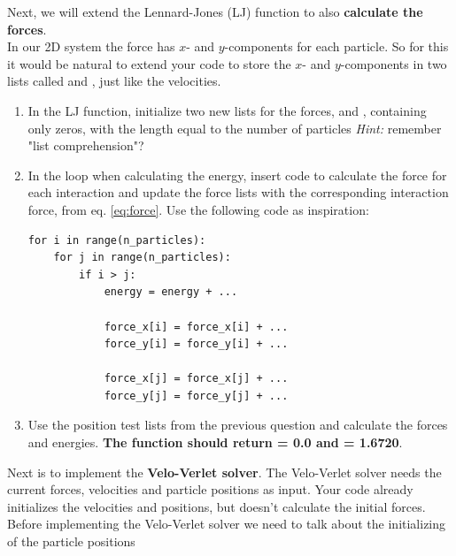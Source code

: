 \documentclass{article}
\begin{document}
Next, we will extend the Lennard-Jones (LJ) function to also {\bf calculate the forces}. \\

In our 2D system the force has $x$- and $y$-components for each particle.
So for this it would be natural to extend your code to store the $x$- and $y$-components in two lists called  and , just like the velocities.

\begin{enumerate}[resume]

    \item In the LJ function, initialize two new lists for the forces,  and , containing only zeros, with the length equal to the number of particles {\em Hint:} remember "list comprehension"?
%

    \item In the loop when calculating the energy, insert code to calculate the force for each interaction and update the force lists with the corresponding interaction force, from eq. \ref{eq:force}.
        Use the following code as inspiration:

\begin{lstlisting}
for i in range(n_particles):
    for j in range(n_particles):
        if i > j:
            energy = energy + ...

            force_x[i] = force_x[i] + ...
            force_y[i] = force_y[i] + ...

            force_x[j] = force_x[j] + ...
            force_y[j] = force_y[j] + ...
\end{lstlisting}

    \item Use the position test lists from the previous question and calculate the forces and energies.
       {\bf The function should return  = 0.0 and  = 1.6720}.

\end{enumerate}

\vspace{10pt}

Next is to implement the {\bf Velo-Verlet solver}.
The Velo-Verlet solver needs the current forces, velocities and particle positions as input.
Your code already initializes the velocities and positions, but doesn't calculate the initial forces. Before implementing the Velo-Verlet solver we need to talk about the initializing of the particle positions \\
\end{document}
